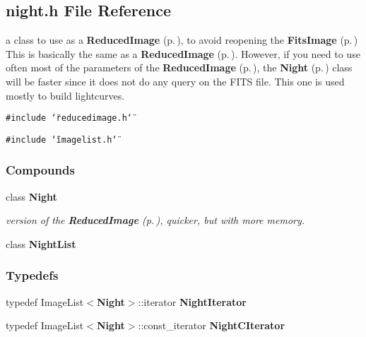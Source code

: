 \subsection{night.h File Reference}
\label{night_h}
a class to use as a {\bf Reduced\-Image} {\rm (p.\,\pageref{class_reducedimage})}, to avoid reopening the {\bf Fits\-Image} {\rm (p.\,\pageref{class_fitsimage})} This is basically the same as a {\bf Reduced\-Image} {\rm (p.\,\pageref{class_reducedimage})}. However, if you need to use often most of the parameters of the {\bf Reduced\-Image} {\rm (p.\,\pageref{class_reducedimage})}, the {\bf Night} {\rm (p.\,\pageref{class_night})} class will be faster since it does not do any query on the FITS file. This one is used mostly to build lightcurves. 


{\tt \#include \char`\"{}reducedimage.h\char`\"{}}\par
{\tt \#include \char`\"{}imagelist.h\char`\"{}}\par
\subsubsection*{Compounds}
\begin{CompactItemize}
\item 
class {\bf Night}
\begin{CompactList}\small\item\em version of the {\bf Reduced\-Image} {\rm (p.\,\pageref{class_reducedimage})}, quicker, but with more memory.\item\end{CompactList}\item 
class {\bf Night\-List}
\end{CompactItemize}
\subsubsection*{Typedefs}
\begin{CompactItemize}
\item 
{}
typedef Image\-List$<${\bf Night}$>$::iterator {\bf Night\-Iterator}\label{night_h_a0}

\item 
{}
typedef Image\-List$<${\bf Night}$>$::const\_\-iterator {\bf Night\-CIterator}\label{night_h_a1}

\end{CompactItemize}
